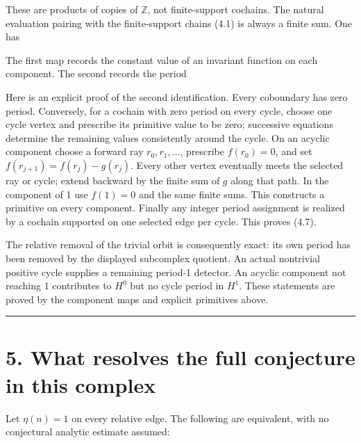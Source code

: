 These are products of copies of \(\mathbb Z\), not finite-support
cochains. The natural evaluation pairing with the finite-support chains
(4.1) is always a finite sum. One has


The first map records the constant value of an invariant function on
each component. The second records the period


Here is an explicit proof of the second identification. Every coboundary
has zero period. Conversely, for a cochain with zero period on every
cycle, choose one cycle vertex and prescribe its primitive value to be
zero; successive equations determine the remaining values consistently
around the cycle. On an acyclic component choose a forward ray
\(r_0,r_1,\ldots\), prescribe \(f(r_0)=0\), and set
\(f(r_{j+1})=f(r_j)-g(r_j)\). Every other vertex eventually meets the
selected ray or cycle; extend backward by the finite sum of \(g\) along
that path. In the component of 1 use \(f(1)=0\) and the same finite
sums. This constructs a primitive on every component. Finally any
integer period assignment is realized by a cochain supported on one
selected edge per cycle. This proves (4.7).

The relative removal of the trivial orbit is consequently exact: its own
period has been removed by the displayed subcomplex quotient. An actual
nontrivial positive cycle supplies a remaining period-1 detector. An
acyclic component not reaching 1 contributes to \(H^0\) but no cycle
period in \(H^1\). These statements are proved by the component maps and
explicit primitives above.

\begin{center}\rule{0.5\linewidth}{0.5pt}\end{center}

\section{5. What resolves the full conjecture in this complex}

Let \(\eta(n)=1\) on every relative edge. The following are equivalent,
with no conjectural analytic estimate assumed:


